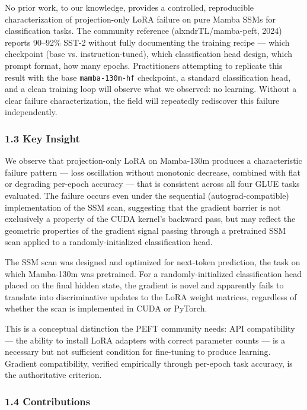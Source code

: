 No prior work, to our knowledge, provides a controlled, reproducible characterization of projection-only LoRA failure on pure Mamba SSMs for classification tasks. The community reference (alxndrTL/mamba-peft, 2024) reports 90--92\% SST-2 without fully documenting the training recipe --- which checkpoint (base vs. instruction-tuned), which classification head design, which prompt format, how many epochs. Practitioners attempting to replicate this result with the base \texttt{mamba-130m-hf} checkpoint, a standard classification head, and a clean training loop will observe what we observed: no learning. Without a clear failure characterization, the field will repeatedly rediscover this failure independently.

\subsubsection{1.3 Key Insight}

We observe that projection-only LoRA on Mamba-130m produces a characteristic failure pattern --- loss oscillation without monotonic decrease, combined with flat or degrading per-epoch accuracy --- that is consistent across all four GLUE tasks evaluated. The failure occurs even under the sequential (autograd-compatible) implementation of the SSM scan, suggesting that the gradient barrier is not exclusively a property of the CUDA kernel's backward pass, but may reflect the geometric properties of the gradient signal passing through a pretrained SSM scan applied to a randomly-initialized classification head.

The SSM scan was designed and optimized for next-token prediction, the task on which Mamba-130m was pretrained. For a randomly-initialized classification head placed on the final hidden state, the gradient is novel and apparently fails to translate into discriminative updates to the LoRA weight matrices, regardless of whether the scan is implemented in CUDA or PyTorch.

This is a conceptual distinction the PEFT community needs: API compatibility --- the ability to install LoRA adapters with correct parameter counts --- is a necessary but not sufficient condition for fine-tuning to produce learning. Gradient compatibility, verified empirically through per-epoch task accuracy, is the authoritative criterion.

\subsubsection{1.4 Contributions}

